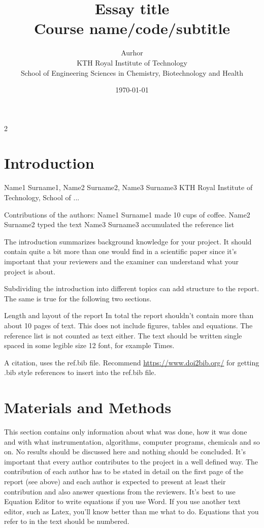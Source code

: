 \documentclass{article}
\title{Essay title\\\Large{Course name/code/subtitle}}
\author{Aurhor \\ KTH Royal Institute of Technology\\ School of Engineering Sciences in Chemistry, Biotechnology and Health}
\date{\today}
\begin{document}
\maketitle
\thispagestyle{fancy}
\clearpage
\tableofcontents
\thispagestyle{fancy}

\clearpage
\fancyfoot[C]{\thepage}
\begin{multicols}{2}

\section*{Introduction}

Name1 Surname1, Name2 Surname2, Name3 Surname3 
KTH Royal Institute of Technology, School of ... 

 
Contributions of the authors: 
Name1 Surname1 made 10 cups of coffee. 
Name2 Surname2 typed the text 
Name3 Surname3 accumulated the reference list 



The introduction summarizes background knowledge for your project. It should contain quite 
a bit more than one would find in a scientific paper since it’s important that your reviewers 
and the examiner can understand what your project is about. 



Subdividing the introduction into different topics can add structure to the report. 
The same is true for the following two sections. 



Length and layout of the report 
In total the report shouldn't contain more than about 10 pages of text. This does not include 
figures, tables and equations. The reference list is not counted as text either. 
The text should be written single spaced in some legible size 12 font, for example Times. 



A citation, uses the ref.bib file.\cite{Beauchamp2015}
Recommend \href{https://www.doi2bib.org/}{https://www.doi2bib.org/} for getting .bib style references to insert into the ref.bib file.

\section*{Materials and Methods}

This section contains only information about what was done, how it was done and with what 
instrumentation, algorithms, computer programs, chemicals and so on. 
No results should be discussed here and nothing should be concluded. 
It’s important that every author contributes to the project in a well defined way. 
The contribution of each author has to be stated in detail on the first page of the report (see 
above) and each author is expected to present at least their contribution and also answer 
questions from the reviewers. 
It’s best to use Equation Editor to write equations if you use Word. If you use another text 
editor, such as Latex, you’ll know better than me what to do. 
Equations that you refer to in the text should be numbered. 



\end{multicols}
\end{document}
